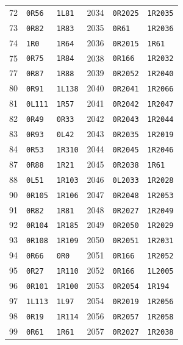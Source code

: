 \begin{longtable}{@{}rll@{\hspace{1.2cm}}rll@{}}
72 & \texttt{0R56} & \texttt{1L81} & 2034 & \texttt{0R2025} & \texttt{1R2035}\\
73 & \texttt{0R82} & \texttt{1R83} & 2035 & \texttt{0R61} & \texttt{1R2036}\\
74 & \texttt{1R0} & \texttt{1R64} & 2036 & \texttt{0R2015} & \texttt{1R61}\\
75 & \texttt{0R75} & \texttt{1R84} & 2038 & \texttt{0R166} & \texttt{1R2032}\\
77 & \texttt{0R87} & \texttt{1R88} & 2039 & \texttt{0R2052} & \texttt{1R2040}\\
80 & \texttt{0R91} & \texttt{1L138} & 2040 & \texttt{0R2041} & \texttt{1R2066}\\
81 & \texttt{0L111} & \texttt{1R57} & 2041 & \texttt{0R2042} & \texttt{1R2047}\\
82 & \texttt{0R49} & \texttt{0R33} & 2042 & \texttt{0R2043} & \texttt{1R2044}\\
83 & \texttt{0R93} & \texttt{0L42} & 2043 & \texttt{0R2035} & \texttt{1R2019}\\
84 & \texttt{0R53} & \texttt{1R310} & 2044 & \texttt{0R2045} & \texttt{1R2046}\\
87 & \texttt{0R88} & \texttt{1R21} & 2045 & \texttt{0R2038} & \texttt{1R61}\\
88 & \texttt{0L51} & \texttt{1R103} & 2046 & \texttt{0L2033} & \texttt{1R2028}\\
90 & \texttt{0R105} & \texttt{1R106} & 2047 & \texttt{0R2048} & \texttt{1R2053}\\
91 & \texttt{0R82} & \texttt{1R81} & 2048 & \texttt{0R2027} & \texttt{1R2049}\\
92 & \texttt{0R104} & \texttt{1R185} & 2049 & \texttt{0R2050} & \texttt{1R2029}\\
93 & \texttt{0R108} & \texttt{1R109} & 2050 & \texttt{0R2051} & \texttt{1R2031}\\
94 & \texttt{0R66} & \texttt{0R0} & 2051 & \texttt{0R166} & \texttt{1R2052}\\
95 & \texttt{0R27} & \texttt{1R110} & 2052 & \texttt{0R166} & \texttt{1L2005}\\
96 & \texttt{0R101} & \texttt{1R100} & 2053 & \texttt{0R2054} & \texttt{1R194}\\
97 & \texttt{1L113} & \texttt{1L97} & 2054 & \texttt{0R2019} & \texttt{1R2056}\\
98 & \texttt{0R19} & \texttt{1R114} & 2056 & \texttt{0R2057} & \texttt{1R2058}\\
99 & \texttt{0R61} & \texttt{1R61} & 2057 & \texttt{0R2027} & \texttt{1R2038}\\

\end{longtable}
